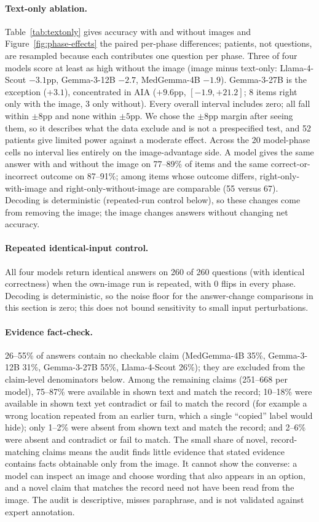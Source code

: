 \documentclass[11pt]{article}
\begin{document}
\paragraph{Text-only ablation.} Table~\ref{tab:textonly} gives accuracy with and without images and Figure~\ref{fig:phase-effects} the paired per-phase differences; patients, not questions, are resampled because each contributes one question per phase. Three of four models score at least as high without the image (image minus text-only: Llama-4-Scout $-3.1$pp, Gemma-3-12B $-2.7$, MedGemma-4B $-1.9$). Gemma-3-27B is the exception ($+3.1$), concentrated in AIA ($+9.6$pp, $[-1.9,+21.2]$; 8 items right only with the image, 3 only without). Every overall interval includes zero; all fall within $\pm8$pp and none within $\pm5$pp. We chose the $\pm8$pp margin after seeing them, so it describes what the data exclude and is not a prespecified test, and 52 patients give limited power against a moderate effect. Across the 20 model-phase cells no interval lies entirely on the image-advantage side. A model gives the same answer with and without the image on 77--89\% of items and the same correct-or-incorrect outcome on 87--91\%; among items whose outcome differs, right-only-with-image and right-only-without-image are comparable (55 versus 67). Decoding is deterministic (repeated-run control below), so these changes come from removing the image; the image changes answers without changing net accuracy.

\paragraph{Repeated identical-input control.} All four models return identical answers on 260 of 260 questions (with identical correctness) when the own-image run is repeated, with 0 flips in every phase. Decoding is deterministic, so the noise floor for the answer-change comparisons in this section is zero; this does not bound sensitivity to small input perturbations.

\paragraph{Evidence fact-check.} 26--55\% of answers contain no checkable claim (MedGemma-4B 35\%, Gemma-3-12B 31\%, Gemma-3-27B 55\%, Llama-4-Scout 26\%); they are excluded from the claim-level denominators below. Among the remaining claims (251--668 per model), 75--87\% were available in shown text and match the record; 10--18\% were available in shown text yet contradict or fail to match the record (for example a wrong location repeated from an earlier turn, which a single ``copied'' label would hide); only 1--2\% were absent from shown text and match the record; and 2--6\% were absent and contradict or fail to match. The small share of novel, record-matching claims means the audit finds little evidence that stated evidence contains facts obtainable only from the image. It cannot show the converse: a model can inspect an image and choose wording that also appears in an option, and a novel claim that matches the record need not have been read from the image. The audit is descriptive, misses paraphrase, and is not validated against expert annotation.
\end{document}
